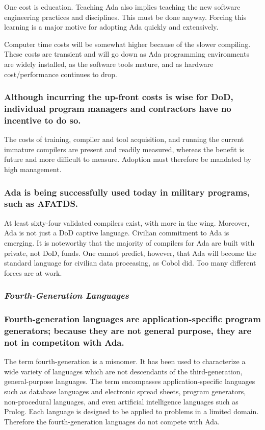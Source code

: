 \documentclass[11pt,final]{article}
\begin{document}
One cost is education. Teaching Ada also implies teaching the new software
engineering practices and disciplines. This must be done anyway. Forcing this
learning is a major motive for adopting Ada quickly and extensively.

Computer time costs will be somewhat higher because of the slower compiling.
These costs are transient and will go down as Ada programming environments are
widely installed, as the software tools mature, and as hardware
cost/performance continues to drop.

\subsubsection*{Although incurring the up-front costs is wise for DoD,
individual program managers and contractors have no incentive to do so.}

The costs of training, compiler and tool acquisition, and running the current
immature compilers are present and readily measured, whereas the benefit is
future and more difficult to measure. Adoption must therefore be mandated by
high management.

\subsubsection*{Ada is being successfully used today in military programs, such
as AFATDS.}

At least sixty-four validated compilers exist, with more in the wing. Moreover,
Ada is not just a DoD captive language. Civilian commitment to Ada is emerging.
It is noteworthy that the majority of compilers for Ada are built with private,
not DoD, funds.  One cannot predict, however, that Ada will become the standard
language for civilian data proceasing, as Cobol did. Too many different forces
are at work.

\subsubsection*{\textit{Fourth-Generation Languages}}

\subsubsection*{Fourth-generation languages are application-specific program
generators; because they are not general purpose, they are not in competiton
with Ada.}

The term fourth-generation is a misnomer. It has been used to characterize a
wide variety of languages which are not descendants of the third-generation,
general-purpose languages. The term encompasses application-specific languages
such as database languages and electronic spread sheets, program generators,
non-procedural languages, and even artificial intelligence languages such as
Prolog. Each language is designed to be applied to problems in a limited
domain. Therefore the fourth-generation languages do not compete with Ada.
\end{document}
